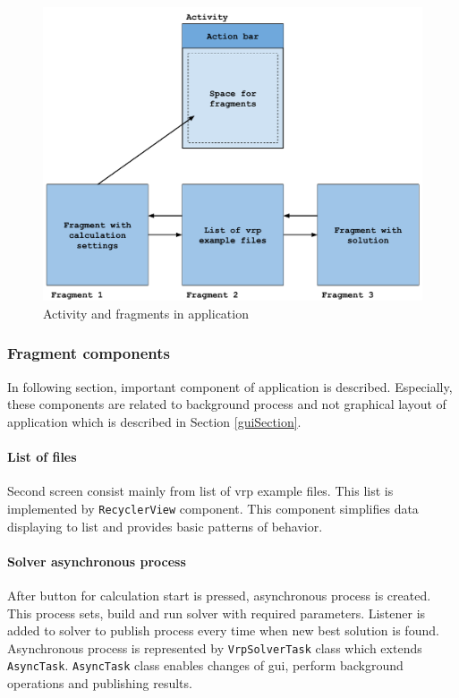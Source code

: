 \begin{figure}[h!]
    \centering
    \includegraphics[scale=0.7]{fig/act_frag.pdf}
    \caption{Activity and fragments in application}
    \label{activityFragment}
\end{figure}

\subsubsection{Fragment components}
In following section, important component of application is described. Especially, these components are related to
background process and not graphical layout of application which is described in Section \ref{guiSection}.

\paragraph{List of files}
Second screen consist mainly from list of vrp example files. This list is implemented by \texttt{RecyclerView}
component. This component simplifies data displaying to list and provides basic patterns of behavior.

\paragraph{Solver asynchronous process}
After button for calculation start is pressed, asynchronous process is created. This process sets, build and run solver
with required parameters. Listener is added to solver to publish process every time when new best solution is found.
Asynchronous process is represented by \texttt{VrpSolverTask} class which extends \texttt{AsyncTask}. \texttt{AsyncTask}
class enables changes of gui, perform background operations and publishing results.

